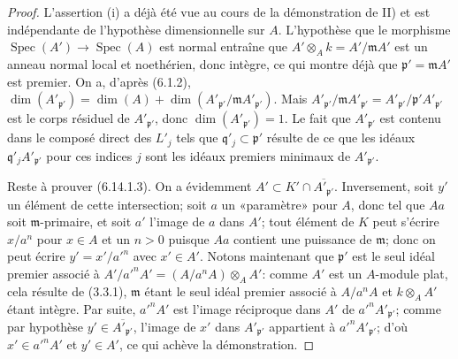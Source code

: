 \begin{proof}
L'assertion (i) a déjà été vue au cours de la démonstration de II) et est
indépendante de l'hypothèse dimensionnelle sur $A$. L'hypothèse que le
morphisme $\operatorname{Spec}(A')\to\operatorname{Spec}(A)$ est normal
entraîne que $A'\otimes_A k=A'/\mathfrak mA'$ est un anneau normal local et
noethérien, donc intègre, ce qui montre déjà que
$\mathfrak p'=\mathfrak mA'$ est premier. On a, d'après (6.1.2),
$\dim(A'_{\mathfrak p'})=\dim(A)+
\dim(A'_{\mathfrak p'}/\mathfrak mA'_{\mathfrak p'})$. Mais
$A'_{\mathfrak p'}/\mathfrak mA'_{\mathfrak p'}=
A'_{\mathfrak p'}/\mathfrak p'A'_{\mathfrak p'}$ est le corps résiduel de
$A'_{\mathfrak p'}$, donc $\dim(A'_{\mathfrak p'})=1$. Le fait que
$A'_{\mathfrak p'}$ est contenu dans le composé direct des $L'_j$ tels que
$\mathfrak q'_j\subset\mathfrak p'$ résulte de ce que les idéaux
$\mathfrak q'_jA'_{\mathfrak p'}$ pour ces indices $j$ sont les idéaux
premiers minimaux de $A'_{\mathfrak p'}$.

Reste à prouver (6.14.1.3). On a évidemment
$A'\subset K'\cap\overline{A'_{\mathfrak p'}}$. Inversement, soit $y'$ un
élément de cette intersection; soit $a$ un «paramètre» pour $A$, donc tel
que $Aa$ soit $\mathfrak m$-primaire, et soit $a'$ l'image de $a$ dans
$A'$; tout élément de $K$ peut s'écrire $x/a^n$ pour $x\in A$ et un $n>0$
puisque $Aa$ contient une puissance de $\mathfrak m$; donc on peut écrire
$y'=x'/a'^n$ avec $x'\in A'$. Notons maintenant que $\mathfrak p'$ est le
seul idéal premier associé à
$A'/a'^nA'=(A/a^nA)\otimes_A A'$: comme $A'$ est un $A$-module plat, cela
résulte de (3.3.1), $\mathfrak m$ étant le seul idéal premier associé à
$A/a^nA$ et $k\otimes_A A'$ étant intègre. Par suite, $a'^nA'$ est l'image
réciproque dans $A'$ de $a'^nA'_{\mathfrak p'}$; comme par hypothèse
$y'\in\overline{A'_{\mathfrak p'}}$, l'image de $x'$ dans
$A'_{\mathfrak p'}$ appartient à $a'^nA'_{\mathfrak p'}$; d'où
$x'\in a'^nA'$ et $y'\in A'$, ce qui achève la démonstration.


\end{proof}
